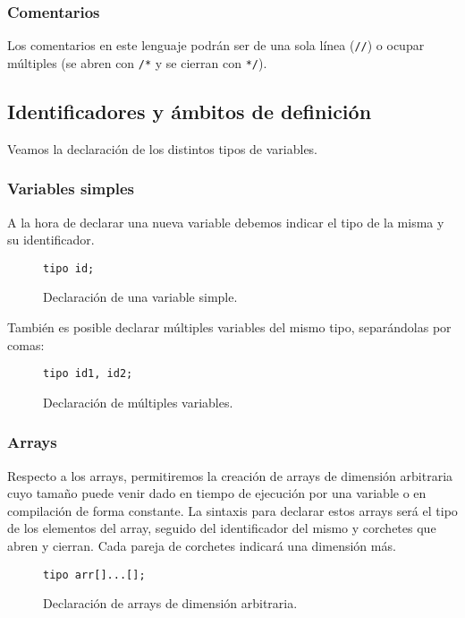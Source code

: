 \subsubsection{Comentarios}
Los comentarios en este lenguaje podrán ser de una sola línea (\lstinline{//}) o
ocupar múltiples (se abren con \lstinline{/*} y se cierran con \lstinline{*/}).

\subsection{Identificadores y ámbitos de definición}
Veamos la declaración de los distintos tipos de variables.
\subsubsection{Variables simples}
A la hora de declarar una nueva variable debemos indicar el tipo de la misma y
su identificador.
\begin{figure}[htbp]
    \centering
    \begin{lstlisting}
tipo id;
    \end{lstlisting}
    \caption{Declaración de una variable simple.}
\end{figure}
También es posible declarar múltiples variables del mismo tipo, separándolas por
comas:
\begin{figure}[htbp]
    \centering
    \begin{lstlisting}
tipo id1, id2;
    \end{lstlisting}
    \caption{Declaración de múltiples variables.}
\end{figure}


\subsubsection{Arrays}
Respecto a los arrays, permitiremos la creación de arrays de dimensión
arbitraria cuyo tamaño puede venir dado en tiempo de ejecución por una variable
o en compilación de forma constante. La sintaxis para declarar estos arrays será
el tipo de los elementos del array, seguido del identificador del mismo y
corchetes que abren y cierran. Cada pareja de corchetes indicará una dimensión
más.
\begin{figure}[htbp]
    \centering
    \begin{lstlisting}
tipo arr[]...[];
    \end{lstlisting}
    \caption{Declaración de arrays de dimensión arbitraria.}
\end{figure}

